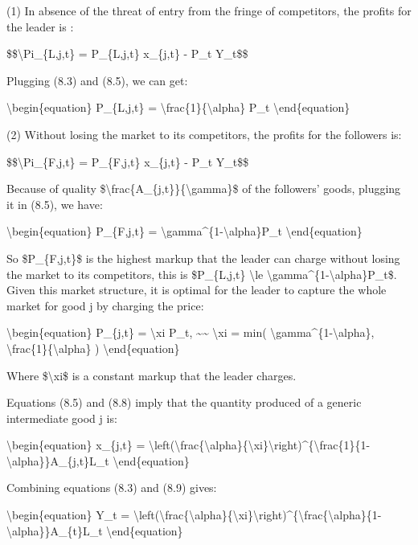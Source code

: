 \documentclass[10pt,math=newtx,citestyle=gb7714-2015,bibstyle=gb7714-2015]{elegantbook}
\begin{document}
	(1) In absence of the threat of entry from the fringe of competitors, the profits for the leader is :
	
	\$\$\textbackslash{}Pi\_\{L,j,t\} = P\_\{L,j,t\} x\_\{j,t\} - P\_t Y\_t\$\$
	
	Plugging (8.3) and (8.5), we can get:
	
	\textbackslash{}begin\{equation\}
	P\_\{L,j,t\} = \textbackslash{}frac\{1\}\{\textbackslash{}alpha\} P\_t
	\textbackslash{}end\{equation\}
	
	(2) Without losing the market to its competitors, the profits for the followers is:
	
	\$\$\textbackslash{}Pi\_\{F,j,t\} = P\_\{F,j,t\} x\_\{j,t\} - P\_t Y\_t\$\$
	
	Because of  quality \$\textbackslash{}frac\{A\_\{j,t\}\}\{\textbackslash{}gamma\}\$ of the followers' goods, plugging it in (8.5), we have:
	
	\textbackslash{}begin\{equation\}
	P\_\{F,j,t\} = \textbackslash{}gamma\^{}\{1-\textbackslash{}alpha\}P\_t
	\textbackslash{}end\{equation\}
	
	So \$P\_\{F,j,t\}\$ is the highest markup that the leader can charge without losing the market to its competitors, this is \$P\_\{L,j,t\}  \textbackslash{}le \textbackslash{}gamma\^{}\{1-\textbackslash{}alpha\}P\_t\$. Given this market structure, it is optimal for the leader to capture the whole market for good j by charging the price:
	
	\textbackslash{}begin\{equation\}
	P\_\{j,t\} = \textbackslash{}xi P\_t, \~{}\~{} \textbackslash{}xi = min( \textbackslash{}gamma\^{}\{1-\textbackslash{}alpha\}, \textbackslash{}frac\{1\}\{\textbackslash{}alpha\} )
	\textbackslash{}end\{equation\}
	
	Where \$\textbackslash{}xi\$ is a constant markup that the leader charges.
	
	Equations (8.5) and (8.8) imply that the quantity produced of a generic intermediate good j is:
	
	\textbackslash{}begin\{equation\}
	x\_\{j,t\} = \textbackslash{}left(\textbackslash{}frac\{\textbackslash{}alpha\}\{\textbackslash{}xi\}\textbackslash{}right)\^{}\{\textbackslash{}frac\{1\}\{1-\textbackslash{}alpha\}\}A\_\{j,t\}L\_t
	\textbackslash{}end\{equation\}
	
	Combining equations (8.3) and (8.9) gives:
	
	\textbackslash{}begin\{equation\}
	Y\_t = \textbackslash{}left(\textbackslash{}frac\{\textbackslash{}alpha\}\{\textbackslash{}xi\}\textbackslash{}right)\^{}\{\textbackslash{}frac\{\textbackslash{}alpha\}\{1-\textbackslash{}alpha\}\}A\_\{t\}L\_t
	\textbackslash{}end\{equation\}
	
\end{document}
